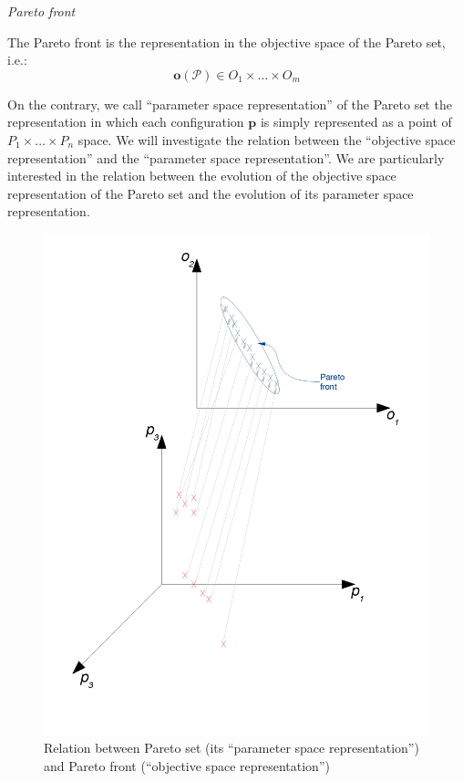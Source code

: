 \begin{defn}
\emph{Pareto front}

The Pareto front is the representation in the objective space of the
Pareto set, i.e.:
\[
\mathbf{o}\left(\mathscr{P}\right)\in O_{1}\times\dots\times O_{m}
\]

\end{defn}
On the contrary, we call ``parameter space representation'' of the
Pareto set the representation in which each configuration $\mathbf{p}$
is simply represented as a point of $P_{1}\times\dots\times P_{n}$
space. We will investigate the relation between the ``objective space
representation'' and the ``parameter space representation''. We
are particularly interested in the relation between the evolution
of the objective space representation of the Pareto set and the evolution
of its parameter space representation.

\begin{figure}[h]
\includegraphics[width=0.9\columnwidth]{img/Pareto_set_and_front}

\caption{Relation between Pareto set (its ``parameter space representation'')
and Pareto front (``objective space representation'')}


\end{figure}

